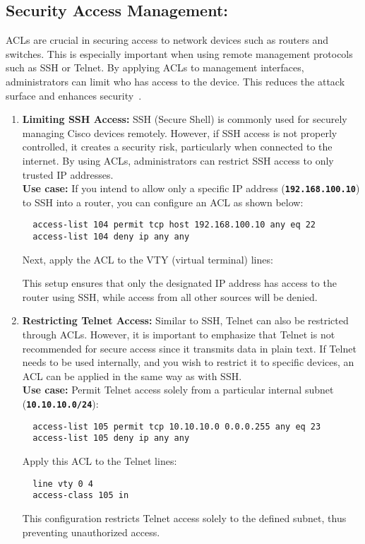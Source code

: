 \documentclass[11pt,a4paper]{article}
\begin{document}
    \subsection*{Security Access Management:}
        ACLs are crucial in securing access to network devices such as routers and switches. This is especially important when using remote management protocols such as SSH or Telnet. By applying ACLs to management interfaces, administrators can limit who has access to the device. This reduces the attack surface and enhances security~\cite{Security-Management}.
            \begin{enumerate}
                \item \textbf{Limiting SSH Access:} SSH (Secure Shell) is commonly used for securely managing Cisco devices remotely. However, if SSH access is not properly controlled, it creates a security risk, particularly when connected to the internet. By using ACLs, administrators can restrict SSH access to only trusted IP addresses.
                \\[1em]
                \textbf{Use case:} If you intend to allow only a specific IP address (\textbf{\lstinline{192.168.100.10}}) to SSH into a router, you can configure an ACL as shown below:
\begin{lstlisting}
  access-list 104 permit tcp host 192.168.100.10 any eq 22
  access-list 104 deny ip any any                  
\end{lstlisting}
                Next, apply the ACL to the VTY (virtual terminal) lines:

                This setup ensures that only the designated IP address has access to the router using SSH, while access from all other sources will be denied.

                \item \textbf{Restricting Telnet Access:} Similar to SSH, Telnet can also be restricted through ACLs. However, it is important to emphasize that Telnet is not recommended for secure access since it transmits data in plain text. If Telnet needs to be used internally, and you wish to restrict it to specific devices, an ACL can be applied in the same way as with SSH.
                \\[1em]
                \textbf{Use case:} Permit Telnet access solely from a particular internal subnet (\textbf{\lstinline{10.10.10.0/24}}):
\begin{lstlisting}
  access-list 105 permit tcp 10.10.10.0 0.0.0.255 any eq 23
  access-list 105 deny ip any any                                                 
\end{lstlisting}
                Apply this ACL to the Telnet lines:
\begin{lstlisting}
  line vty 0 4
  access-class 105 in                                              
\end{lstlisting}
                This configuration restricts Telnet access solely to the defined subnet, thus preventing unauthorized access.

            \end{enumerate}
\end{document}
